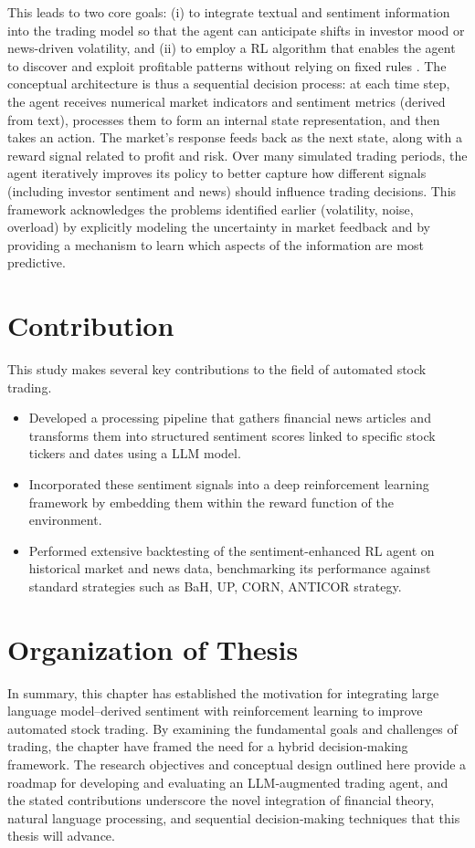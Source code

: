 This leads to two core goals: (i) to integrate textual and sentiment information into the trading model so that the agent can anticipate shifts in investor mood or news-driven volatility, and (ii) to employ a \gls{RL} algorithm that enables the agent to discover and exploit profitable patterns without relying on fixed rules \cite{Nevmyvaka2006}. The conceptual architecture is thus a sequential decision process: at each time step, the agent receives numerical market indicators and sentiment metrics (derived from text), processes them to form an internal state representation, and then takes an action. The market's response feeds back as the next state, along with a reward signal related to profit and risk. Over many simulated trading periods, the agent iteratively improves its policy to better capture how different signals (including investor sentiment and news) should influence trading decisions. This framework acknowledges the problems identified earlier (volatility, noise, overload) by explicitly modeling the uncertainty in market feedback and by providing a mechanism to learn which aspects of the information are most predictive.

\section{Contribution}
\label{sec:contribution}
This study makes several key contributions to the field of automated stock trading.

\begin{itemize}
  \item Developed a processing pipeline that gathers financial news articles and transforms them into structured sentiment scores linked to specific stock tickers and dates using a \gls{LLM} model.
  \item Incorporated these sentiment signals into a deep reinforcement learning framework by embedding them within the reward function of the environment.
  \item Performed extensive backtesting of the sentiment-enhanced RL agent on historical market and news data, benchmarking its performance against standard strategies such as \gls{BaH}, \gls{UP}, \gls{CORN}, \gls{ANTICOR} strategy.
\end{itemize}

\section{Organization of Thesis}

In summary, this chapter has established the motivation for integrating large language model–derived sentiment with reinforcement learning to improve automated stock trading. By examining the fundamental goals and challenges of trading, the chapter have framed the need for a hybrid decision‐making framework. The research objectives and conceptual design outlined here provide a roadmap for developing and evaluating an LLM‐augmented trading agent, and the stated contributions underscore the novel integration of financial theory, natural language processing, and sequential decision‐making techniques that this thesis will advance.
